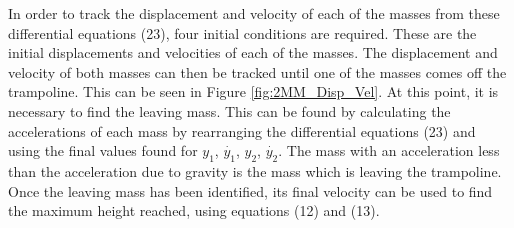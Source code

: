 \noindent In order to track the displacement and velocity of each of the masses from these differential equations (23), four initial conditions are required. These are the initial displacements and velocities of each of the masses. The displacement and velocity of both masses can then be tracked until one of the masses comes off the trampoline. This can be seen in Figure \ref{fig:2MM_Disp_Vel}. At this point, it is necessary to find the leaving mass. This can be found by calculating the accelerations of each mass by rearranging the differential equations (23) and using the final values found for $y_1$, $\dot{y_1}$, $y_2$, $\dot{y_2}$. The mass with an acceleration less than the acceleration due to gravity is the mass which is leaving the trampoline. Once the leaving mass has been identified, its final velocity can be used to find the maximum height reached, using equations (12) and (13). \\

